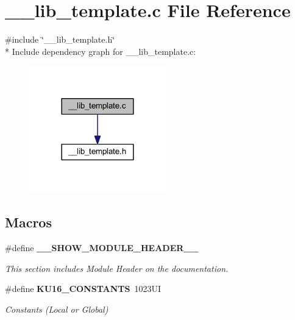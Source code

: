 \section{\-\_\-\-\_\-lib\-\_\-template.\-c File Reference}
\label{____lib__template_8c}
{\ttfamily \#include \char`\"{}\-\_\-\-\_\-lib\-\_\-template.\-h\char`\"{}}\\*
Include dependency graph for \-\_\-\-\_\-lib\-\_\-template.\-c\-:\nopagebreak
\begin{figure}[H]
\begin{center}
\leavevmode
\includegraphics[width=168pt]{____lib__template_8c__incl}
\end{center}
\end{figure}
\subsection*{Macros}
\begin{DoxyCompactItemize}
\item 
\#define {\bf \-\_\-\-\_\-\-S\-H\-O\-W\-\_\-\-M\-O\-D\-U\-L\-E\-\_\-\-H\-E\-A\-D\-E\-R\-\_\-\-\_\-}
\begin{DoxyCompactList}\small\item\em This section includes Module Header on the documentation. \end{DoxyCompactList}\item 
\#define {\bf K\-U16\-\_\-\-C\-O\-N\-S\-T\-A\-N\-T\-S}~1023\-U\-I
\begin{DoxyCompactList}\small\item\em Constants (Local or Global) \end{DoxyCompactList}\end{DoxyCompactItemize}
